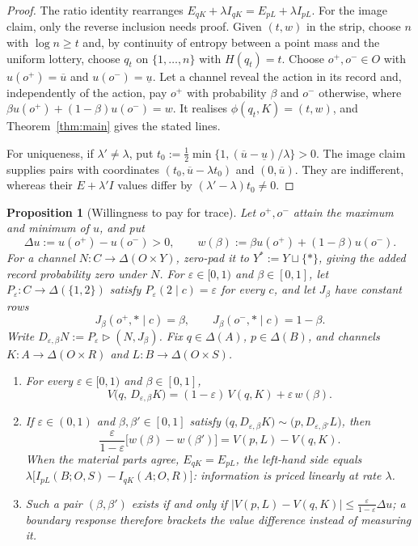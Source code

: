 \documentclass[11pt,a4paper]{article}
\newtheorem{proposition}[theorem]{Proposition}
\theoremstyle{definition}
\newcommand{\D}{\Delta}
\newcommand{\I}{I}
\newcommand{\Sh}{H}
\newcommand{\1}{\mathbf 1}
\begin{document}
\begin{proof}
The ratio identity rearranges
$E_{qK}+\lambda\I_{qK}=E_{pL}+\lambda\I_{pL}$.
For the image claim, only the reverse inclusion needs proof.  Given
$(t,w)$ in the strip, choose $n$ with $\log n\ge t$ and, by continuity of
entropy between a point mass and the uniform lottery, choose $q_t$ on
$\{1,\ldots,n\}$ with $\Sh(q_t)=t$.  Choose $o^+,o^-\in O$ with
$u(o^+)=\overline u$ and $u(o^-)=\underline u$.  Let a channel reveal the
action in its record and, independently of the action, pay $o^+$ with
probability $\beta$ and $o^-$ otherwise, where
$\beta u(o^+)+(1-\beta)u(o^-)=w$.  It realises
$\phi(q_t,K)=(t,w)$, and Theorem~\ref{thm:main} gives the stated lines.

For uniqueness, if $\lambda'\ne\lambda$, put
$t_0:=\tfrac12\min\{1,(\overline u-\underline u)/\lambda\}>0$.
The image claim supplies pairs with coordinates
$(t_0,\overline u-\lambda t_0)$ and $(0,\overline u)$.  They are indifferent,
whereas their $E+\lambda'\I$ values differ by
$(\lambda'-\lambda)t_0\ne0$.
\end{proof}

\begin{proposition}[Willingness to pay for trace]
\label{prop:wtp}\label{def:dilution}
Let $o^+,o^-$ attain the maximum and minimum of $u$, and put
\[
 \Delta u:=u(o^+)-u(o^-)>0,
 \qquad
 w(\beta):=\beta u(o^+)+(1-\beta)u(o^-).
\]
For a channel $N:C\to\D(O\times Y)$, zero-pad it to
$Y^\ast:=Y\sqcup\{\ast\}$, giving the added record probability zero under $N$.  For $\varepsilon\in[0,1)$ and
$\beta\in[0,1]$, let $P_\varepsilon:C\to\D(\{1,2\})$ satisfy
$P_\varepsilon(2\mid c)=\varepsilon$ for every $c$, and let $J_\beta$ have
constant rows
\[
 J_\beta(o^+,\ast\mid c)=\beta,
 \qquad J_\beta(o^-,\ast\mid c)=1-\beta.
\]
Write
$D_{\varepsilon,\beta}N:=P_\varepsilon\triangleright(N,J_\beta)$.
Fix $q\in\D(A)$, $p\in\D(B)$, and channels $K:A\to\D(O\times R)$ and $L:B\to\D(O\times S)$.
\begin{enumerate}[label=\textup{(\roman*)},leftmargin=*]
\item For every $\varepsilon\in[0,1)$ and $\beta\in[0,1]$,
\[
 V\bigl(q,\,D_{\varepsilon,\beta}K\bigr)=(1-\varepsilon)\,V(q,K)+\varepsilon\,w(\beta).
\]
\item If $\varepsilon\in(0,1)$ and $\beta,\beta'\in[0,1]$ satisfy
$\bigl(q,D_{\varepsilon,\beta}K\bigr)\sim\bigl(p,D_{\varepsilon,\beta'}L\bigr)$, then
\[
 \frac{\varepsilon}{1-\varepsilon}\bigl[w(\beta)-w(\beta')\bigr]
 =V(p,L)-V(q,K).
\]
When the material parts agree, $E_{qK}=E_{pL}$, the left-hand side equals
$\lambda\bigl[\I_{pL}(B;O,S)-\I_{qK}(A;O,R)\bigr]$: information is priced linearly at rate $\lambda$.
\item Such a pair $(\beta,\beta')$ exists if and only if
$\lvert V(p,L)-V(q,K)\rvert\le\frac{\varepsilon}{1-\varepsilon}\Delta u$; a boundary response therefore brackets
the value difference instead of measuring it.
\end{enumerate}
\end{proposition}
\end{document}
